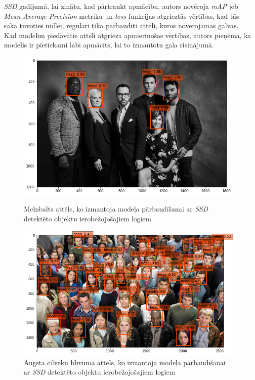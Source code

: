 \textit{SSD} gadījumā, lai zinātu, kad pārtraukt apmācību, autors novēroja \textit{mAP} jeb \textit{Mean Average Precision} metriku un \textit{loss} funkcijas atgrieztās vērtības, kad tās sāka tuvoties nullei, regulāri tika pārbaudīti attēli, kuros novērojamas galvas. Kad modelim piedāvātie attēli atgrieza apmierinošas vērtības, autors pieņēma, ka modelis ir pietiekami labi apmācīts, lai to izmantotu gala risinājumā. 
\begin{figure}[!htb]
	\includegraphics[width=\linewidth]{images/caffessd1.png}
	\caption{Melnbalts attēls, ko izmantoja modeļa pārbaudīšanai ar \textit{SSD} detektēto objektu ierobežojošajiem logiem}
	\endminipage\hfill
	\includegraphics[width=\linewidth]{images/caffessd2.png}
	\caption{Augsta cilvēku blīvuma attēls, ko izmantoja modeļa pārbaudīšanai ar \textit{SSD} detektēto objektu ierobežojošajiem logiem}
	\endminipage
\end{figure}

